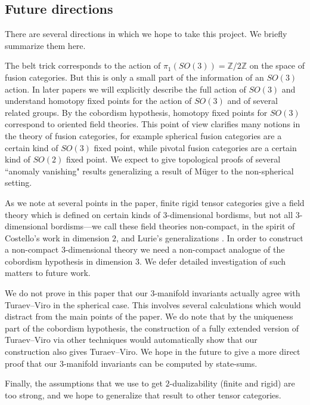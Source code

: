 \documentclass{amsart}
\begin{document}
\subsection{Future directions}

There are several directions in which we hope to take this project. We briefly summarize them here.

The belt trick corresponds to the action of $\pi_1(SO(3)) = \mathbb{Z}/2\mathbb{Z}$ on the space of fusion categories.  But this is only a small part of the information of an $SO(3)$ action.  In later papers we will explicitly describe the full action of $SO(3)$ and understand homotopy fixed points for the action of $SO(3)$ and of several related groups.  By the cobordism hypothesis, homotopy fixed points for $SO(3)$ correspond to oriented field theories.  This point of view clarifies many notions in the theory of fusion categories, for example spherical fusion categories are a certain kind of $SO(3)$ fixed point, while pivotal fusion categories are a certain kind of $SO(2)$ fixed point.  We expect to give topological proofs of several ``anomaly vanishing" results generalizing a result of M\"uger \cite{MR1966525} to the non-spherical setting. 

As we note at several points in the paper, finite rigid tensor categories give a field theory which is defined on certain kinds of $3$-dimensional bordisms, but not all $3$-dimensional bordisms---we call these field theories non-compact, in the spirit of Costello's work \cite{MR2298823} in dimension $2$, and Lurie's generalizations \cite[\S 4.2]{lurie-ch}.  In order to construct a non-compact $3$-dimensional theory we need a non-compact analogue of the cobordism hypothesis in dimension $3$.  We defer detailed investigation of such matters to future work.

We do not prove in this paper that our $3$-manifold invariants actually agree with Turaev--Viro in the spherical case.  This involves several calculations which would distract from the main points of the paper.  We do note that by the uniqueness part of the cobordism hypothesis, the construction of a fully extended version of Turaev--Viro via other techniques would automatically show that our construction also gives Turaev--Viro.  We hope in the future to give a more direct proof that our $3$-manifold invariants can be computed by state-sums. %

Finally, the assumptions that we use to get $2$-dualizability (finite and rigid) are too strong, and we hope to generalize that result to other tensor categories.
\end{document}
